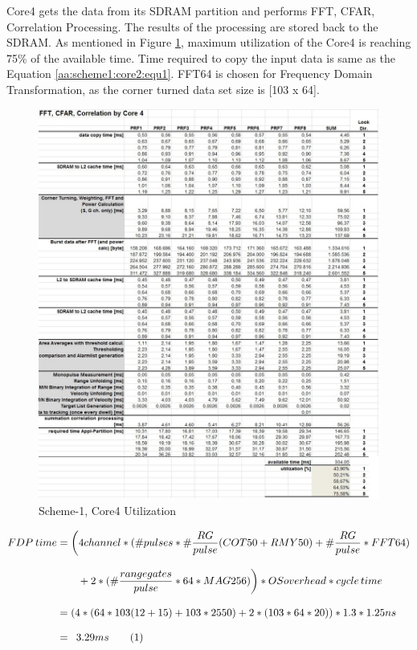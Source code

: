 \FloatBarrier
Core4 gets the data from its SDRAM partition and performs FFT, CFAR, Correlation Processing. The results of the processing are stored back to the SDRAM. As mentioned in Figure \ref{fig:existing_analysis:aa_scheme1_cpu_util4}, maximum utilization of the Core4 is reaching 75\% of the available time.  Time required to copy the input data is same as the Equation \ref{aa:scheme1:core2:equ1}. FFT64 is chosen for Frequency Domain Transformation, as the corner turned data set size is [103 x 64].
\begin{figure}[h!]
	\centering
	\includegraphics[width=150mm]{figures/aa_scheme1_cpu_util_4}
	\caption{Scheme-1, Core4 Utilization}
	\label{fig:existing_analysis:aa_scheme1_cpu_util4}
\end{figure}

\begin{align*}
	\label{aa:scheme1:core4:equ1}
	FDP \: time &= \bigg(4channel * (\#pulses * \# \frac{RG}{pulse} (COT50 + RMY50) + \# \frac{RG}{pulse} * FFT64) \\[0.3cm] 
	& \qquad + 2 * (\# \frac{range gates}{pulse} * 64 * MAG256)\bigg) * OSoverhead * cycle \, time \\[0.3cm]
	&= (4 * (64 * 103 (12 + 15) + 103 * 2550) + 2 * (103 * 64 * 20)) * 1.3 * 1.25ns \enspace \\[0.3cm]
	&= \enspace 3.29ms  \stepcounter{equation}\tag{\theequation} 
\end{align*}

